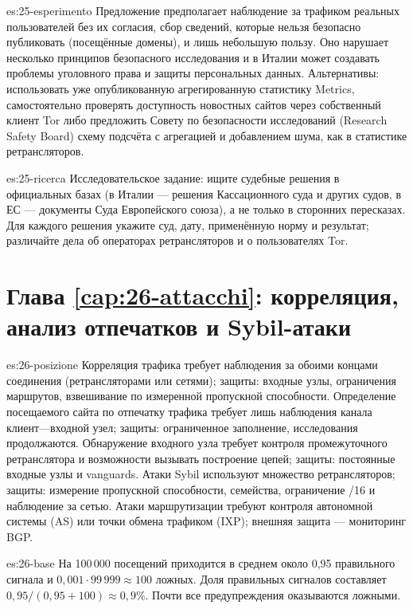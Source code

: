 \begin{soluzione}{es:25-esperimento}
Предложение предполагает наблюдение за трафиком реальных пользователей без их согласия, сбор сведений, которые нельзя безопасно публиковать (посещённые домены), и лишь небольшую пользу. Оно нарушает несколько принципов безопасного исследования и в Италии может создавать проблемы уголовного права и защиты персональных данных. Альтернативы: использовать уже опубликованную агрегированную статистику Metrics, самостоятельно проверять доступность новостных сайтов через собственный клиент Tor либо предложить Совету по безопасности исследований (Research Safety Board) схему подсчёта с агрегацией и добавлением шума, как в статистике ретрансляторов.
\end{soluzione}

\begin{soluzione}{es:25-ricerca}
Исследовательское задание: ищите судебные решения в официальных базах (в Италии — решения Кассационного суда и других судов, в ЕС — документы Суда Европейского союза), а не только в сторонних пересказах. Для каждого решения укажите суд, дату, применённую норму и результат; различайте дела об операторах ретрансляторов и о пользователях Tor.
\end{soluzione}

\section*{Глава \ref{cap:26-attacchi}: корреляция, анализ отпечатков и Sybil-атаки}

\begin{soluzione}{es:26-posizione}
Корреляция трафика требует наблюдения за обоими концами соединения (ретрансляторами или сетями); защиты: входные узлы, ограничения маршрутов, взвешивание по измеренной пропускной способности. Определение посещаемого сайта по отпечатку трафика требует лишь наблюдения канала клиент—входной узел; защиты: ограниченное заполнение, исследования продолжаются. Обнаружение входного узла требует контроля промежуточного ретранслятора и возможности вызывать построение цепей; защиты: постоянные входные узлы и vanguards. Атаки Sybil используют множество ретрансляторов; защиты: измерение пропускной способности, семейства, ограничение /16 и наблюдение за сетью. Атаки маршрутизации требуют контроля автономной системы (AS) или точки обмена трафиком (IXP); внешняя защита — мониторинг BGP.
\end{soluzione}

\begin{soluzione}{es:26-base}
На 100\,000 посещений приходится в среднем около 0,95 правильного сигнала и $0{,}001 \cdot 99\,999 \approx 100$ ложных. Доля правильных сигналов составляет $0{,}95/(0{,}95+100) \approx 0{,}9\%$. Почти все предупреждения оказываются ложными.
\end{soluzione}

